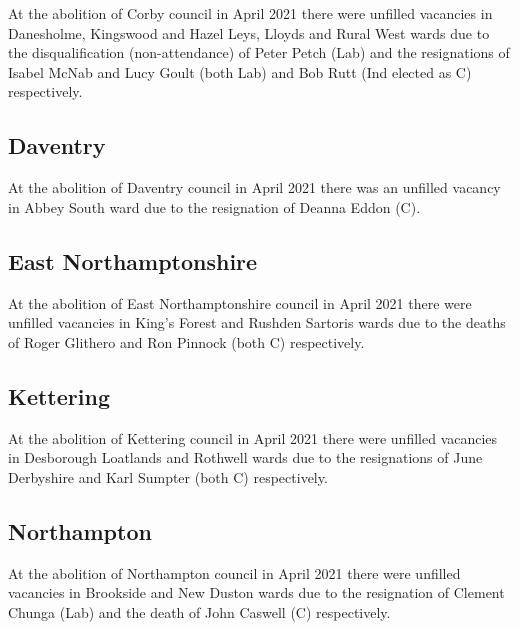 \documentclass[a4paper,openany]{book}
\begin{document}
\begin{resultsiii}
At the abolition of Corby council in April 2021 there were un{fi}lled vacancies in Danesholme, Kingswood and Hazel Leys, Lloyds and Rural West wards due to the disquali{fi}cation (non-attendance) of Peter Petch (Lab) and the resignations of Isabel McNab and Lucy Goult (both Lab) and Bob Rutt (Ind elected as C) respectively.

\subsection*{Daventry}

At the abolition of Daventry council in April 2021 there was an unfilled vacancy in Abbey South ward due to the resignation of Deanna Eddon (C).

\subsection*{East Northamptonshire}

At the abolition of East Northamptonshire council in April 2021 there were unfilled vacancies in King's Forest and Rushden Sartoris wards due to the deaths of Roger Glithero and Ron Pinnock (both C) respectively.

\subsection*{Kettering}

At the abolition of Kettering council in April 2021 there were unfilled vacancies in Desborough Loatlands and Rothwell wards due to the resignations of June Derbyshire and Karl Sumpter (both C) respectively.

\subsection*{Northampton}

At the abolition of Northampton council in April 2021 there were unfilled vacancies in Brookside and New Duston wards due to the resignation of Clement Chunga (Lab) and the death of John Caswell (C) respectively.


\end{resultsiii}
\end{document}
